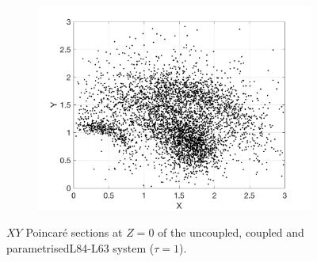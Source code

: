 \documentclass[12pt]{article}
\begin{document}
\begin{figure}[H]
\begin{subfigure}[b]{0.3\textwidth}
		\includegraphics[width=\textwidth]{plots/l84l63/poincare_xy_p.png}
	\end{subfigure}
	\caption{\label{poincarexy} $XY$ Poincar\'e sections at $Z=0$ of the uncoupled, coupled and parametrisedL84-L63 system ($\tau=1$).}
\end{figure}
\end{document}
